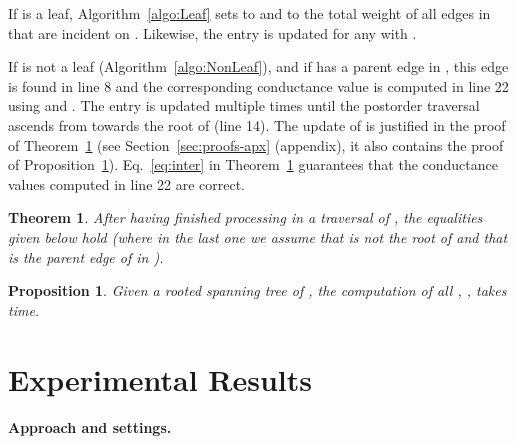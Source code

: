 \documentclass[pdftex]{llncs}
\newtheorem{consTheorem}[example]{Theorem}
\newtheorem{consProposition}[example]{Proposition}
\numberwithin{equation}{section}
\numberwithin{example}{section}
\numberwithin{table}{section}
\begin{document}
If  is a leaf, Algorithm~\ref{algo:Leaf} sets  to
 and  to the total weight of all edges in
 that are incident on . Likewise, the entry
 is updated for any  with . 

If  is not a leaf (Algorithm~\ref{algo:NonLeaf}), and if  has a parent edge in , 
this edge is found in line 8 and the corresponding conductance value is computed in line 22 using  and
. The entry  is updated
multiple times until the postorder traversal ascends from  towards
the root of  (line 14). The
update of  is justified in the proof of
Theorem~\ref{prop:update} (see Section~\ref{sec:proofs-apx} 
(appendix), it also contains the proof of Proposition~\ref{prop:time}).
Eq.~\ref{eq:inter} in Theorem~\ref{prop:update}
guarantees that the conductance values computed in line 22 are correct. 









\begin{consTheorem}
\label{prop:update}
After having finished processing  in a traversal of , the
equalities given below hold (where in the last one we assume that 
is not the root of  and that  is the parent edge of  in
).


\end{consTheorem}

\begin{consProposition}
\label{prop:time}
Given a rooted spanning tree  of , the computation
of all , , takes  time.
\end{consProposition}

\section{Experimental Results}
\label{sec:results}
\paragraph{Approach and settings.}
\end{document}
